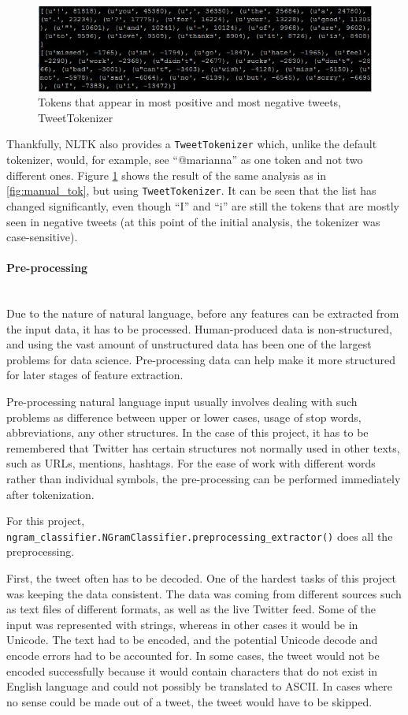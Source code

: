 \begin{figure}
    \centering
    \includegraphics[width=\textwidth]{most_pos_neg_tw_tokenizer}
    \caption{Tokens that appear in most positive and most negative tweets, TweetTokenizer}
    \label{fig:tweettok}
\end{figure}


Thankfully, NLTK also provides a \texttt{TweetTokenizer} which, unlike the default tokenizer, would, for example, see ``@marianna'' as one token and not two different ones. Figure \ref{fig:tweettok} shows the result of the same analysis as in \ref{fig:manual_tok}, but using \texttt{TweetTokenizer}. It can be seen that the list has changed significantly, even though ``I'' and ``i'' are still the tokens that are mostly seen in negative tweets (at this point of the initial analysis, the tokenizer was case-sensitive). 


\paragraph{Pre-processing} \mbox{} \\
Due to the nature of natural language, before any features can be extracted from the input data, it has to be processed. Human-produced data is non-structured, and using the vast amount of unstructured data has been one of the largest problems for data science. Pre-processing data can help make it more structured for later stages of feature extraction. 

Pre-processing natural language input usually involves dealing with such problems as difference between upper or lower cases, usage of stop words, abbreviations, any other structures. In the case of this project, it has to be remembered that Twitter has certain structures not normally used in other texts, such as URLs, mentions, hashtags. For the ease of work with different words rather than individual symbols, the pre-processing can be performed immediately after tokenization. 

For this project, \texttt{ngram\_classifier.NGramClassifier.preprocessing\_extractor()} does all the preprocessing. 

First, the tweet often has to be decoded. One of the hardest tasks of this project was keeping the data consistent. The data was coming from different sources such as text files of different formats, as well as the live Twitter feed. Some of the input was represented with strings, whereas in other cases it would be in Unicode. The text had to be encoded, and the potential Unicode decode and encode errors had to be accounted for. In some cases, the tweet would not be encoded successfully because it would contain characters that do not exist in English language and could not possibly be translated to ASCII. In cases where no sense could be made out of a tweet, the tweet would have to be skipped. 
